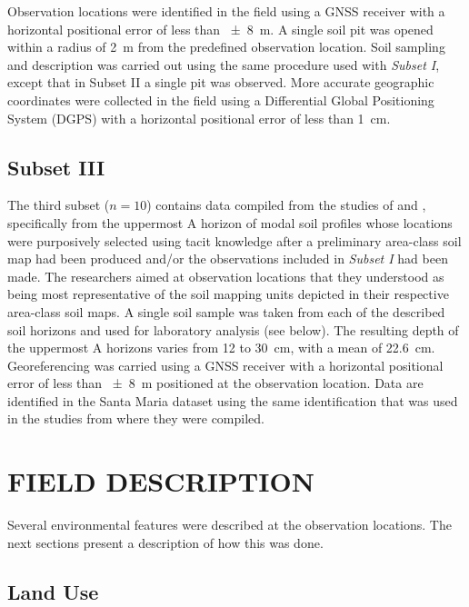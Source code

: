 Observation locations were identified in the field using a GNSS receiver with a horizontal positional error
of less than \SI{\pm8}{\metre}. A single soil pit was opened within a radius of \SI{2}{\metre} from the 
predefined observation location. Soil sampling and description was carried out using the same procedure used 
with \emph{Subset I}, except that in Subset II a single pit was observed. More accurate geographic coordinates 
were collected in the field using a Differential Global Positioning System (DGPS) with a horizontal positional 
error of less than \SI{1}{\centi\metre}.

\subsection{Subset III}

The third subset ($n = 10$) contains data compiled from the studies of  and
, specifically from the uppermost A horizon of modal soil profiles whose locations 
were purposively selected using tacit knowledge after a preliminary area-class soil map had been produced 
and/or the observations included in \emph{Subset I} had been made. The researchers aimed at observation 
locations that they understood as being most representative of the soil mapping units depicted in their 
respective area-class soil maps. A single soil sample was taken from each of the described soil horizons and 
used for laboratory analysis (see below). The resulting depth of the uppermost A horizons varies from \num{12} 
to \SI{30}{\centi\metre}, with a mean of \SI{22.6}{\centi\metre}. Georeferencing was carried using a GNSS 
receiver with a horizontal positional error of less than \SI{\pm8}{\metre} positioned at the observation 
location. Data are identified in the Santa Maria dataset using the same identification that was used in the 
studies from where they were compiled.

\section{FIELD DESCRIPTION}

Several environmental features were described at the observation locations. The next sections present a 
description of how this was done.

\subsection{Land Use}

